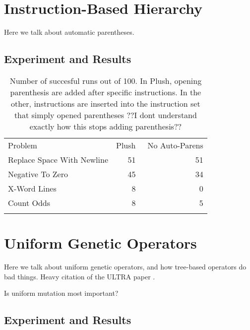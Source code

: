 \section{Instruction-Based Hierarchy}

Here we talk about automatic parentheses.


\subsection{Experiment and Results}


\begin{table}
\centering
\caption{
Number of succesful runs out of 100.
In Plush, opening parenthesis are added after specific instructions.
In the other, instructions are inserted into the instruction set that
simply opened parentheses
     ??I dont understand exactly how this stops adding parenthesis??
}
\label{no-auto-parens-experiment}       %
%
%
\begin{tabular}{l r r}
\hline\noalign{\smallskip}
Problem                    & Plush & ~No Auto-Parens \\
\noalign{\smallskip}\svhline\noalign{\smallskip}
Replace Space With Newline &  51 & 51 \\
Negative To Zero           &  45 & 34 \\
X-Word Lines               &   8 &  0 \\
Count Odds                 &   8 &  5 \\
\noalign{\smallskip}\hline\noalign{\smallskip}
\end{tabular}
\end{table}

\section{Uniform Genetic Operators}

Here we talk about uniform genetic operators, and how tree-based operators do bad things. Heavy citation of the ULTRA paper \citep{Spector:2013:GPTP}.

Is uniform mutation most important?


\subsection{Experiment and Results}



